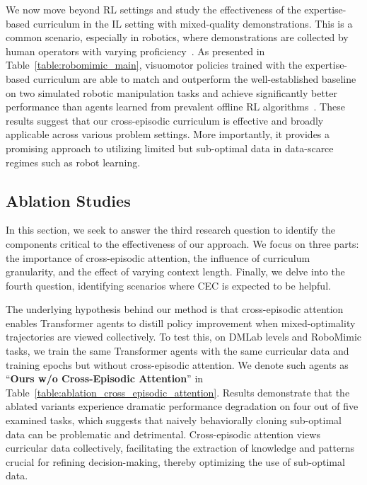 

\vspace{-0.5em}

We now move beyond RL settings and study the effectiveness of the expertise-based curriculum in the IL setting with mixed-quality demonstrations.
This is a common scenario, especially in robotics, where demonstrations are collected by human operators with varying proficiency~\citep{mandlekar2018roboturk}.
As presented in Table~\ref{table:robomimic_main}, visuomotor policies trained with the expertise-based curriculum are able to match and outperform the well-established baseline~\citep{mandlekar2021matters} on two simulated robotic manipulation tasks and achieve significantly better performance than agents learned from prevalent offline RL algorithms~\citep{fujimoto2018offpolicy,kumar2020conservative}.
These results suggest that our cross-episodic curriculum is effective and broadly applicable across various problem settings.
More importantly, it provides a promising approach to utilizing limited but sub-optimal data in data-scarce regimes such as robot learning.

\vspace{-0.5em}

\subsection{Ablation Studies}
In this section, we seek to answer the third research question to identify the components critical to the effectiveness of our approach.
We focus on three parts: the importance of cross-episodic attention, the influence of curriculum granularity, and the effect of varying context length.
Finally, we delve into the fourth question, identifying scenarios where CEC is expected to be helpful.





\vspace{-0.5em}

The underlying hypothesis behind our method is that cross-episodic attention enables Transformer agents to distill policy improvement when mixed-optimality trajectories are viewed collectively.
To test this, on DMLab levels and RoboMimic tasks, we train the same Transformer agents with the same curricular data and training epochs but without cross-episodic attention.
We denote such agents as ``\textbf{Ours w/o Cross-Episodic Attention}'' in Table~\ref{table:ablation_cross_episodic_attention}.
Results demonstrate that the ablated variants experience dramatic performance degradation on four out of five examined tasks, which suggests that naively behaviorally cloning sub-optimal data can be problematic and detrimental.
Cross-episodic attention views curricular data collectively, facilitating the extraction of knowledge and patterns crucial for refining decision-making, thereby optimizing the use of sub-optimal data.

